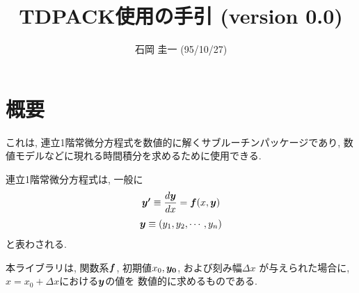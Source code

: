%
%

\title{TDPACK使用の手引 (version 0.0)}
\author{石岡 圭一  (95/10/27)}
\date{}

\newcommand{\y}{\mbox{\boldmath $y$}}
\newcommand{\yi}{\mbox{\boldmath $y_0$}}
\newcommand{\yd}{\mbox{\boldmath $y'$}}
\newcommand{\f}{\mbox{\boldmath $f$}}
\newcommand{\g}{\mbox{\boldmath $g$}}
\newcommand{\bb}{\mbox{\boldmath $b$}}



\maketitle

\section{概要}

これは, 連立1階常微分方程式を数値的に解くサブルーチンパッケージであり,
数値モデルなどに現れる時間積分を求めるために使用できる.

連立1階常微分方程式は, 一般に
\begin{equation}
\yd\equiv\frac{d\y}{dx}=\f (x,\y)
\end{equation}
\begin{equation}
\y\equiv (y_1,y_2,\cdots,y_n)
\end{equation}
と表わされる. 

本ライブラリは, 
関数系$\f$, 初期値$x_0, \yi$, および刻み幅$\Delta x$
が与えられた場合に, $x=x_0+\Delta x$における$\y$の値を
数値的に求めるものである.

